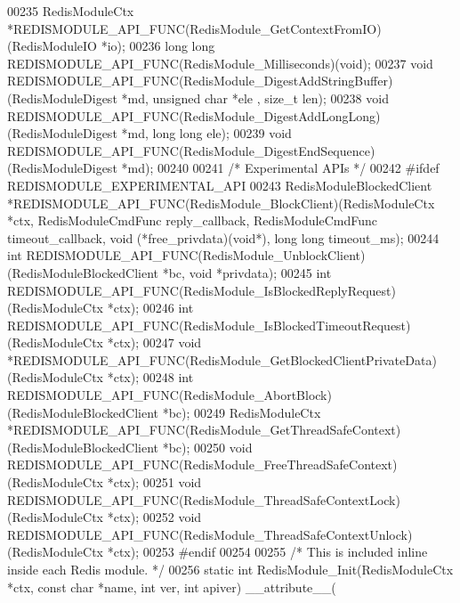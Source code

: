 \begin{DoxyCode}
00235 RedisModuleCtx *REDISMODULE\_API\_FUNC(RedisModule\_GetContextFromIO)(RedisModuleIO *io);
00236 \textcolor{keywordtype}{long} \textcolor{keywordtype}{long} REDISMODULE\_API\_FUNC(RedisModule\_Milliseconds)(\textcolor{keywordtype}{void});
00237 \textcolor{keywordtype}{void} REDISMODULE\_API\_FUNC(RedisModule\_DigestAddStringBuffer)(RedisModuleDigest *md, \textcolor{keywordtype}{unsigned} \textcolor{keywordtype}{char} *ele
      , size\_t len);
00238 \textcolor{keywordtype}{void} REDISMODULE\_API\_FUNC(RedisModule\_DigestAddLongLong)(RedisModuleDigest *md, \textcolor{keywordtype}{long} \textcolor{keywordtype}{long} ele);
00239 \textcolor{keywordtype}{void} REDISMODULE\_API\_FUNC(RedisModule\_DigestEndSequence)(RedisModuleDigest *md);
00240 
00241 \textcolor{comment}{/* Experimental APIs */}
00242 \textcolor{preprocessor}{#}\textcolor{preprocessor}{ifdef} \textcolor{preprocessor}{REDISMODULE\_EXPERIMENTAL\_API}
00243 RedisModuleBlockedClient *REDISMODULE\_API\_FUNC(RedisModule\_BlockClient)(RedisModuleCtx *ctx, 
      RedisModuleCmdFunc reply\_callback, RedisModuleCmdFunc timeout\_callback, \textcolor{keywordtype}{void} (*free\_privdata)(\textcolor{keywordtype}{void}*), \textcolor{keywordtype}{long} \textcolor{keywordtype}{long} 
      timeout\_ms);
00244 \textcolor{keywordtype}{int} REDISMODULE\_API\_FUNC(RedisModule\_UnblockClient)(RedisModuleBlockedClient *bc, \textcolor{keywordtype}{void} *privdata);
00245 \textcolor{keywordtype}{int} REDISMODULE\_API\_FUNC(RedisModule\_IsBlockedReplyRequest)(RedisModuleCtx *ctx);
00246 \textcolor{keywordtype}{int} REDISMODULE\_API\_FUNC(RedisModule\_IsBlockedTimeoutRequest)(RedisModuleCtx *ctx);
00247 \textcolor{keywordtype}{void} *REDISMODULE\_API\_FUNC(RedisModule\_GetBlockedClientPrivateData)(RedisModuleCtx *ctx);
00248 \textcolor{keywordtype}{int} REDISMODULE\_API\_FUNC(RedisModule\_AbortBlock)(RedisModuleBlockedClient *bc);
00249 RedisModuleCtx *REDISMODULE\_API\_FUNC(RedisModule\_GetThreadSafeContext)(RedisModuleBlockedClient *bc);
00250 \textcolor{keywordtype}{void} REDISMODULE\_API\_FUNC(RedisModule\_FreeThreadSafeContext)(RedisModuleCtx *ctx);
00251 \textcolor{keywordtype}{void} REDISMODULE\_API\_FUNC(RedisModule\_ThreadSafeContextLock)(RedisModuleCtx *ctx);
00252 \textcolor{keywordtype}{void} REDISMODULE\_API\_FUNC(RedisModule\_ThreadSafeContextUnlock)(RedisModuleCtx *ctx);
00253 \textcolor{preprocessor}{#}\textcolor{preprocessor}{endif}
00254 
00255 \textcolor{comment}{/* This is included inline inside each Redis module. */}
00256 \textcolor{keyword}{static} \textcolor{keywordtype}{int} RedisModule\_Init(RedisModuleCtx *ctx, \textcolor{keyword}{const} \textcolor{keywordtype}{char} *name, \textcolor{keywordtype}{int} ver, \textcolor{keywordtype}{int} apiver) \textcolor{keyword}{\_\_attribute\_\_}(

\end{DoxyCode}
